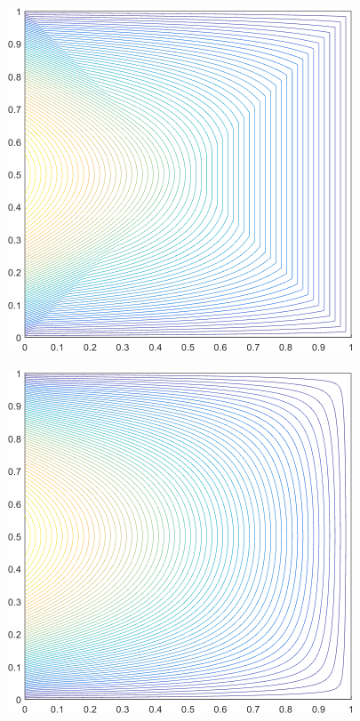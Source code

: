 \documentclass[11pt]{article}
\begin{document}
\begin{figure}
\begin{subfigure}[b]{0.240\textwidth}
		\includegraphics[width=\textwidth]{figures/square_PWLD2_contour_b8.png}
		\caption{}
	\end{subfigure}
	\vfill
	\begin{subfigure}[b]{0.240\textwidth}
		\centering
		\includegraphics[width=\textwidth]{figures/square_MV2_contour_b8.png}

\end{subfigure}
\end{figure}
\end{document}
